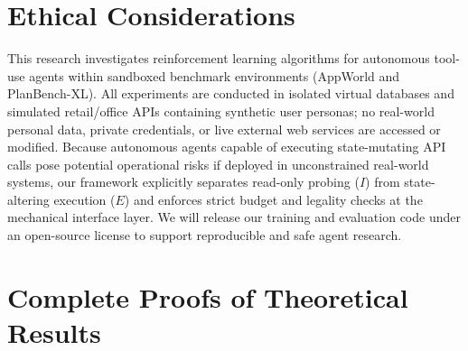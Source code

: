 \documentclass[11pt]{article}
\theoremstyle{definition}
\theoremstyle{remark}
\begin{document}
\section*{Ethical Considerations}
\label{sec:ethics}
This research investigates reinforcement learning algorithms for autonomous tool-use agents within sandboxed benchmark environments (AppWorld and PlanBench-XL). All experiments are conducted in isolated virtual databases and simulated retail/office APIs containing synthetic user personas; no real-world personal data, private credentials, or live external web services are accessed or modified. Because autonomous agents capable of executing state-mutating API calls pose potential operational risks if deployed in unconstrained real-world systems, our framework explicitly separates read-only probing ($I$) from state-altering execution ($E$) and enforces strict budget and legality checks at the mechanical interface layer. We will release our training and evaluation code under an open-source license to support reproducible and safe agent research.



\appendix

\section{Complete Proofs of Theoretical Results}
\label{app:proofs}
\end{document}
